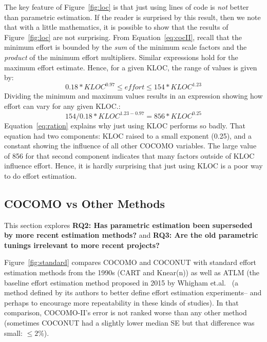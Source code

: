 \documentclass[smallcondesed]{svjour3}
\newcommand{\fig}[1]{Figure~\ref{fig:#1}}
\newcommand{\eq}[1]{Equation~\ref{eq:#1}}
\newenvironment{BLUE}{\color{black}}{\ignorespacesafterend}
\newcommand{\HERE}[1]{}
\begin{document}
The key feature of \fig{loc}
is that  just using lines of
code is {\em not}  better than parametric estimation.
If the reader is surprised by this result, then we note that
with a little
 mathematics, it is possible to show
 that the results of \fig{loc} are not surprising.
 From \eq{cocII}, recall that
the minimum  
effort  is bounded by the  {\em sum} of the minimum scale factors
and the {\em product} of the minimum effort multipliers.
Similar expressions hold for the  maximum effort estimate. Hence,
for a given KLOC, the range of values is given by:
\[
0.18*\mathit{KLOC}^{0.97}  \le \mathit{effort} \le 154*\mathit{KLOC}^{1.23}\]
Dividing the minimum and maximum values results in an  expression showing
how    effort can vary for any given KLOC.: 
\begin{equation}\label{eq:ration}
154/0.18 *\mathit{KLOC}^{1.23 - 0.97} = 856*\mathit{KLOC}^{0.25}
\end{equation} 
 \eq{ration} explains why just using KLOC performs so badly. 
That equation had two components: KLOC raised to
a small exponent (0.25), and a constant showing the influence of all  other
COCOMO variables. The large value of 856 for that second component
indicates that many factors outside of KLOC influence effort. Hence, it is hardly
surprising that just using KLOC is a poor way to do effort estimation.












 

 

\subsection{COCOMO vs Other Methods}\label{sect:othermethods}
This section explores {\bf RQ2: 
Has parametric estimation been superseded
by more recent estimation methods?}
and {\bf RQ3: Are the old parametric tunings irrelevant to
more recent projects?}


\fig{standard} compares COCOMO and COCONUT with  
standard effort estimation methods
from the 1990s (CART and Knear(n))
\begin{BLUE}\HERE{Reviewer2f}
  as well as  ATLM (the baseline effort estimation method
  proposed in 2015 by Whigham et.al.~\cite{whigham15} (a method defined
  by its authors to better define effort
  estimation experiments-- and perhaps
  to encourage more repeatability in these
  kinds of studies).
  \end{BLUE}
In that comparison,   COCOMO-II's error is not ranked worse than any other method
(sometimes
  COCONUT had a slightly lower median SE but that difference was small: $\le 2$\%).
\end{document}
